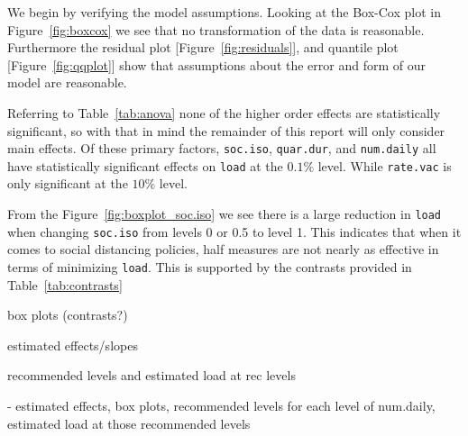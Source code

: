 \documentclass[12pt,a4paper]{article}
\begin{document}
We begin by verifying the model assumptions. Looking at the Box-Cox plot in Figure~\ref{fig:boxcox} we see that no transformation of the data is reasonable. Furthermore the  residual plot [Figure~\ref{fig:residuals}], and quantile plot [Figure~\ref{fig:qqplot}] show that assumptions about the error and form of our model are reasonable.

Referring to Table~\ref{tab:anova} none of the higher order effects are statistically significant, so with that in mind the remainder of this report will only consider main effects. Of these primary factors, \verb`soc.iso`, \verb`quar.dur`, and \verb`num.daily` all have statistically significant effects on \verb`load` at the $0.1\%$ level. While \verb`rate.vac` is only significant at the $10\%$ level.

From the Figure~\ref{fig:boxplot_soc.iso} we see there is a large reduction in \verb`load` when changing \verb`soc.iso` from levels 0 or 0.5 to level 1. This indicates that when it comes to social distancing policies, half measures are not nearly as effective in terms of minimizing \verb`load`. This is supported by the contrasts provided in Table~\ref{tab:contrasts}

box plots (contrasts?)

estimated effects/slopes

recommended levels and estimated load at rec levels

- estimated effects, box plots, recommended levels for each level of num.daily, estimated load at those recommended levels
	
%
%
%
\end{document}
